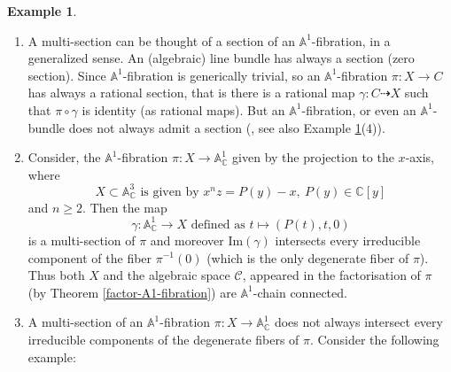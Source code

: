 \documentclass[11pt, reqno]{amsart}
\theoremstyle{plain}
\theoremstyle{definition}
\newtheorem{example}[thm]{Example}
\newcommand{\A}{{\mathbb A}}
\newcommand{\C}{{\mathbb C}}
\begin{document}
\begin{example} \label{multi-section example}
\begin{enumerate}
\item A multi-section can be thought of a section of an $\mathbb{A}^1$-fibration, in a generalized sense. An (algebraic) line bundle has always a section (zero section). Since $\A^1$-fibration is generically trivial, so an $\A^1$-fibration $\pi:X \to C$ has always a rational section, that is there is a rational map $\gamma: C \dashrightarrow X$ such that $\pi \circ \gamma$ is identity (as rational maps). But an $\A^1$-fibration, or even an $\mathbb{A}^1$-bundle does not always admit a section  (\cite[Example 2]{doub}, see also Example \ref{multi-section example}(4)). 
\item Consider, the $\mathbb{A}^1$-fibration $\pi: X \to \mathbb{A}^1_{\mathbb{C}}$ given by the projection to the $x$-axis, where 
$$X \subset \mathbb{A}^3_\mathbb{C} \text{ is given by } x^nz = P(y) - x, \ P(y) \in \mathbb{C}[y] $$
 and $n \geq 2$.
Then the map 
$$\gamma: \mathbb{A}^1_{\mathbb{C}} \to X \text{ defined as } t \mapsto (P(t), t, 0)$$
is a multi-section of $\pi$ and moreover $\text{Im}(\gamma)$ intersects every irreducible component of the fiber $\pi^{-1}(0)$ (which is the only degenerate fiber of $\pi$). Thus both $X$ and the algebraic space $\mathcal{C}$, appeared in the factorisation of $\pi$ (by Theorem \ref{factor-A1-fibration}) are $\mathbb{A}^1$-chain connected. 
\item 	A multi-section of an $\A^1$-fibration $\pi: X \to \A^1_\C$ does not always intersect every irreducible components of the degenerate fibers of $\pi$. Consider the following example:


\end{enumerate}
\end{example}
\end{document}

